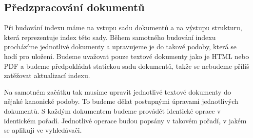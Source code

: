 \documentclass[12pt]{article}
\begin{document}
\subsection{Předzpracování dokumentů}
\label{prepr}
Při budování indexu máme na vstupu sadu dokumentů a na výstupu strukturu, která reprezentuje index této sady. Během samotného budování indexu procházíme jednotlivé dokumenty a upravujeme je do takové podoby, která se hodí pro uložení. Budeme uvažovat pouze textové dokumenty jako je HTML nebo PDF a budeme předpokládat statickou sadu dokumentů, takže se nebudeme příliš zatěžovat aktualizací indexu. 

Na samotném začátku tak musíme upravit jednotlivé textové dokumenty do nějaké kanonické podoby. To budeme dělat postupnými úpravami jednotlivých dokumentů. S každým dokumentem budeme provádět identické oprace v identickém pořadí. Jednotlivé operace budou popsány v takovém pořadí, v jakém se aplikují ve vyhledávači. 
\end{document}
